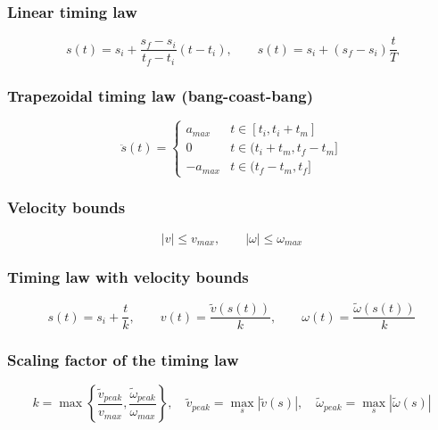 \subsubsection{Linear timing law}
\begin{equation*}
    s(t)=s_i+\frac{s_f-s_i}{t_f-t_i}(t-t_i),\qquad s(t)=s_i+(s_f-s_i)\frac{t}{T}
\end{equation*}

\subsubsection{Trapezoidal timing law (bang-coast-bang)}
\begin{equation*}
    \ddot s(t)=\begin{cases}
        a_{max}&t\in[t_i,t_i+t_m]\\
        0&t\in(t_i+t_m,t_f-t_m]\\
        -a_{max}&t\in(t_f-t_m,t_f]
    \end{cases}
\end{equation*}

\subsubsection{Velocity bounds}
\begin{equation*}
    |v|\le v_{max},\qquad|\omega|\le\omega_{max}
\end{equation*}

\subsubsection{Timing law with velocity bounds}
\begin{equation*}
    s(t)=s_i+\frac{t}{k},\qquad v(t)=\frac{\tilde v(s(t))}{k},\qquad\omega(t)=\frac{\tilde\omega(s(t))}{k}
\end{equation*}

\subsubsection{Scaling factor of the timing law}
\begin{equation*}
    k=\max\left\{\frac{\tilde v_{peak}}{v_{max}},\frac{\tilde\omega_{peak}}{\omega_{max}}\right\},\quad
    \tilde v_{peak}=\max_{s}|\tilde v(s)|,\quad\tilde\omega_{peak}=\max_{s}|\tilde\omega(s)|
\end{equation*}

